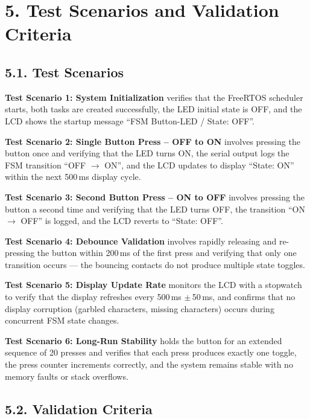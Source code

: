 \documentclass[12pt]{article}
\begin{document}
\section*{5. Test Scenarios and Validation Criteria}

\subsection*{5.1. Test Scenarios}

\textbf{Test Scenario 1: System Initialization} verifies that the FreeRTOS scheduler starts, both tasks are created successfully, the LED initial state is OFF, and the LCD shows the startup message ``FSM Button-LED / State: OFF''.

\textbf{Test Scenario 2: Single Button Press – OFF to ON} involves pressing the button once and verifying that the LED turns ON, the serial output logs the FSM transition ``OFF $\rightarrow$ ON'', and the LCD updates to display ``State: ON'' within the next 500\,ms display cycle.

\textbf{Test Scenario 3: Second Button Press – ON to OFF} involves pressing the button a second time and verifying that the LED turns OFF, the transition ``ON $\rightarrow$ OFF'' is logged, and the LCD reverts to ``State: OFF''.

\textbf{Test Scenario 4: Debounce Validation} involves rapidly releasing and re-pressing the button within 200\,ms of the first press and verifying that only one transition occurs — the bouncing contacts do not produce multiple state toggles.

\textbf{Test Scenario 5: Display Update Rate} monitors the LCD with a stopwatch to verify that the display refreshes every 500\,ms $\pm$\,50\,ms, and confirms that no display corruption (garbled characters, missing characters) occurs during concurrent FSM state changes.

\textbf{Test Scenario 6: Long-Run Stability} holds the button for an extended sequence of 20 presses and verifies that each press produces exactly one toggle, the press counter increments correctly, and the system remains stable with no memory faults or stack overflows.

\subsection*{5.2. Validation Criteria}
\end{document}
